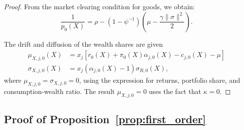 \begin{proof}
From the market clearing condition for goods, we obtain:
\begin{equation}
    \frac{1}{p_0(X)} = \rho  - \left(1-\psi^{-1}\right)  \left( \mu - \frac{\gamma\|\sigma\|^2}{2} \right).
\end{equation}

The drift and diffusion of the wealth shares are given 
\begin{align}
    \mu_{X,j,0}(X) &= x_j \left[ r_0(X) + \pi_0(X) \alpha_{j,0}(X) - c_{j,0}(X) -\mu   \right]\\
    \sigma_{X,j,0}(X) &= x_j (\alpha_{j,0}(X) - 1)\sigma_{R,0}(X),
\end{align}
where $\mu_{X,j,0} = \sigma_{X,j,0} = 0$, using the expression for returns, portfolio share, and consumption-wealth ratio. The result  $\mu_{X,j,0} = 0$ uses the fact that $\kappa = 0$.
\end{proof}

\subsection{Proof of Proposition~\ref{prop:first_order}}\label{app:prop_first_order}

